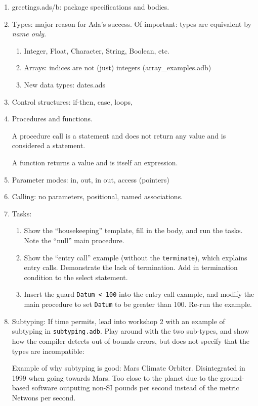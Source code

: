 \documentclass[11pt]{article}
\begin{document}
\begin{enumerate}
 \item greetings.ads/b:  package specifications and bodies.

 \item Types: major reason for Ada's success. Of important: types are equivalent by \emph{name only}.

  \begin{enumerate}

  \item Integer, Float, Character, String, Boolean, etc.

  \item Arrays: indices are not (just) integers (array\_examples.adb)

  \item New data types: dates.ads

  \end{enumerate}

  \item Control structures: if-then, case, loops,

  \item Procedures and functions.

   A procedure call is a statement and does not return any value and is considered a statement. 

   A function returns a value and is itself an expression. 

  \item Parameter modes: in, out, in out, access (pointers)

  \item Calling: no parameters, positional, named associations.

  \item Tasks:

   \begin{enumerate}
     \item Show the ``housekeeping'' template, fill in the body, and run the tasks. Note the ``null'' main procedure.

    \item Show the ``entry call'' example (without the \texttt{terminate}), which explains entry calls. Demonstrate the lack of termination. Add in termination condition to the select statement.
    \item Insert the guard \texttt{Datum < 100} into the entry call example, and modify the main procedure to set \texttt{Datum} to be greater than 100. Re-run the example.
   \end{enumerate}

 \item Subtyping: If time permits, lead into workshop 2 with an example of subtyping in \texttt{subtyping.adb}. Play around with the two sub-types, and show how the compiler detects out of bounds errors, but does not specify that the types are incompatible:

   Example of why subtyping is good: Mars Climate Orbiter. Disintegrated in 1999 when going towards Mars. Too close to the planet due to the ground-based software outputing non-SI pounds per second instead of the metric Netwons per second.

\end{enumerate}
\end{document}
